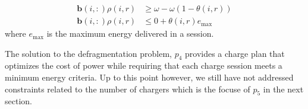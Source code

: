 \begin{equation}\label{eqn:defragmentation:fragmented}\begin{aligned}
	\mathbf{b}(i,:)\rho(i,r) &\ge \omega - \omega(1 - \theta(i,r)) \\
	\mathbf{b}(i,:)\rho(i,r) &\le 0 + \theta(i,r)e_{\text{max}}
\end{aligned}\end{equation}
where $e_{\text{max}}$ is the maximum energy delivered in a session. 
\par The solution to the defragmentation problem, $p_4$ provides a charge plan that optimizes the cost of power while requiring that each charge session meets a minimum energy criteria. Up to this point however, we still have not addressed constraints  related to the number of chargers which is the focuse of $p_5$ in the next section.
\\[0.1in] 


